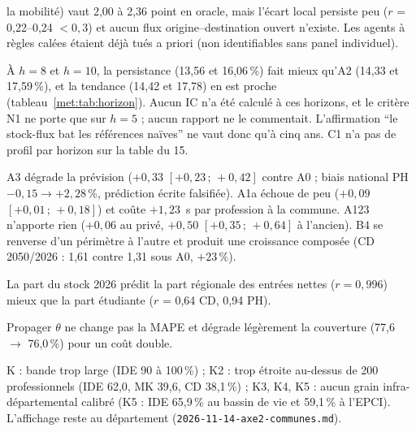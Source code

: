 \begin{description}
    la mobilité) vaut 2,00 à 2,36\mesure{} point en oracle, mais l'écart local persiste peu
    ($r$ = 0,22--0,24\mesure{} $< 0{,}3$) et aucun flux origine--destination ouvert n'existe. Les agents à
    règles calées étaient déjà tués a priori (non identifiables sans panel individuel).
  \item[Persistance meilleure qu'A2 à $h \ge 8$.] À $h = 8$ et $h = 10$, la persistance
    (13,56 et 16,06\,\%\mesure) fait mieux qu'A2 (14,33 et 17,59\,\%\mesure), et la tendance (14,42 et
    17,78) en est proche (tableau~\ref{met:tab:horizon}). Aucun IC n'a été calculé à ces horizons, et le
    critère N1 ne porte que sur $h = 5$ ; aucun rapport ne le commentait. L'affirmation \enquote{le
    stock-flux bat les références naïves} ne vaut donc qu'à cinq ans. C1 n'a pas de profil par horizon
    sur la table du 15.
  \item[Variantes stock-flux.] A3 dégrade la prévision ($+0{,}33$ $[+0{,}23\,;\,+0{,}42]$\mesure{} contre
    A0 ; biais national PH $-0{,}15 \to +2{,}28$\,\%\mesure, prédiction écrite falsifiée). A1a échoue de
    peu ($+0{,}09$ $[+0{,}01\,;\,+0{,}18]$\mesure) et coûte $+1{,}23$\mesure{}~s par profession à la
    commune. A123 n'apporte rien ($+0{,}06$ au privé, $+0{,}50$ $[+0{,}35\,;\,+0{,}64]$\mesure{} à
    l'ancien). B4 se renverse d'un périmètre à l'autre et produit une croissance composée
    (CD 2050/2026 : 1,61 contre 1,31\mesure{} sous A0, $+23\,\%$\derive).
  \item[C5, région de formation.] La part du stock 2026 prédit la part régionale des entrées nettes
    ($r = 0{,}996$\mesure) mieux que la part étudiante ($r$ = 0,64 CD, 0,94 PH\mesure).
  \item[C2.] Propager $\theta$ ne change pas la MAPE et dégrade légèrement la couverture (77,6 $\to$
    76,0\,\%\mesure) pour un coût double.
  \item[Échelle communale.] K : bande trop large (IDE 90 à 100\,\%\mesure) ; K2 : trop étroite au-dessus de
    200 professionnels (IDE 62,0, MK 39,6, CD 38,1\,\%\mesure) ; K3, K4, K5 : aucun grain
    infra-départemental calibré (K5 : IDE 65,9\,\% au bassin de vie et 59,1\,\% à l'EPCI\mesure).
    L'affichage reste au département (\texttt{2026-11-14-axe2-communes.md}).
\end{description}

